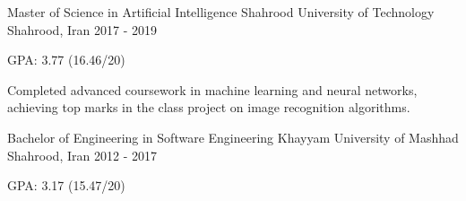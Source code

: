 

\begin{cventries}

  \cventry
    {Master of Science in Artificial Intelligence} %
    {Shahrood University of Technology} %
    {Shahrood, Iran} %
    {2017 - 2019} %
    {
      \begin{cvitems} %
      	\item {GPA: 3.77 (16.46/20)}
      	\item{Completed advanced coursework in machine learning and neural networks, achieving top marks in the class project on image recognition algorithms.}
      \end{cvitems}
    }
    
    \cventry
    {Bachelor of Engineering in Software Engineering} %
    {Khayyam University of Mashhad} %
    {Shahrood, Iran} %
    {2012 - 2017} %
    {
    \begin{cvitems} %
    	\item {GPA: 3.17 (15.47/20)}
    \end{cvitems}
    }

\end{cventries}
